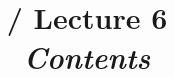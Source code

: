 \renewcommand{\prevlecture}{5 }
\renewcommand{\thislecture}{6 }
\renewcommand{\nextlecture}{7 }

%
%

\title[\modulename / Lecture \thislecture]
{
  \modulename / Lecture \thislecture \\
  {\it Contents}\\
}



\begin{frame}[plain]
  \titlepage
\end{frame}


